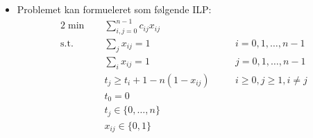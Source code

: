 \begin{itemize}
\begin{itemize}
\begin{equation*}
    \end{equation*}
  \end{itemize}
  \item Problemet kan formueleret som følgende ILP:
  \begin{alignat*}{2}
         \min \quad  & \sum_{i,j=0}^{n-1}c_{ij}x_{ij} \\
   \text{s.t.} \quad & \sum_{j} x_{ij} = 1 &&\quad i=0,1,\dots,n-1 \\
                     & \sum_{i} x_{ij} = 1 &&\quad j=0,1,\dots,n-1 \\
                     & t_j \geq t_i +1 - n(1-x_{ij}) &&\quad i \geq 0, j \geq 1, i \neq j \\
                     & t_0 = 0 \\
                     & t_j \in \{0, \dots, n\} \\
                     & x_{ij} \in \{0,1\}
 \end{alignat*}
\end{itemize}

